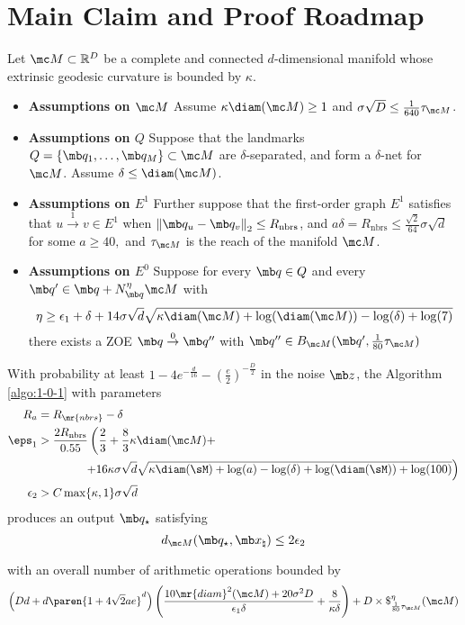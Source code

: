 \section{Main Claim and Proof Roadmap}
\begin{theorem} 
Let $\mc M \subset \mathbb{R}^D$ be a complete and connected $d$-dimensional manifold whose extrinsic geodesic curvature is bounded by $\kappa$. 
\begin{itemize}
    \item {\bf Assumptions on $\mc M$}
    Assume $\kappa \diam(\mc M) \ge 1$ and $\sigma \sqrt{D} \leq \frac{1}{640} \tau_{\mc M}$.
    \item {\bf Assumptions on $Q$} Suppose that the landmarks $Q=\left\{\mb q_1, \dots, \mb q_{ M}\right\} \subset \mc M$ are $\delta$-separated, and form a $\delta$-net for $\mc M$. Assume $\delta \le \diam(\mc M)$.
    \item {\bf Assumptions on $E^1$} Further suppose that the first-order graph $E^1$ satisfies that $u \overset{1}{\rightarrow} v \in E^1$ when $\left\|\mb q_u - \mb q_v\right\|_2 \leq R_{\text{nbrs}}$, and ${a\delta} = R_{\text{nbrs}} \leq \frac{\sqrt{2}}{64}\sigma\sqrt{d}$ for some $a\ge40,$ and $\tau_{\mc M}$ is the reach of the manifold $\mc M$.  
    \item {\bf Assumptions on $E^0$}  Suppose for every $\mb q \in Q$ and every $\mb q' \in \mb q + N^{\eta}_{\mb q}\mc M$ with 
    \begin{equation}  \eta \geq  \epsilon_1 + \delta + 14\sigma\sqrt{d}\sqrt{\kappa\diam(\mc M)+\log(\diam(\mc M))-\log(\delta)+\log(7)}
    \end{equation} there exists a ZOE $\mb q \overset{0}{\rightarrow} \mb q''$ with $\mb q'' \in B_{\mc M}( \mb q', \frac{1}{80}\tau_{\mc M} )$
\end{itemize} 
With probability at least $ 1-4e^{-\frac{d}{16}} - \left(\frac{e}{2}\right)^{-\frac{D}{2}}$ in the noise $\mb z$, the Algorithm \ref{algo:1-0-1} with parameters 
\begin{align} 
R_a &= R_{\mr{nbrs}} - \delta\\
\eps_1 &>  \frac{2R_{\text{nbrs}}}{0.55}\left(\frac{2}{3} + \frac{8}{3}\kappa \diam(\mc M) + \right.\\
&\qquad \qquad \left.+16\kappa\sigma\sqrt{d}\sqrt{\kappa \diam(\sM) + \log(a) - \log(\delta) + \log(\diam(\sM)) + \log(100)}\right) \\ 
\epsilon_2 &> C\max\{\kappa,1\} \sigma \sqrt{d} 
\end{align} 
produces an output $\mb q_\star$ satisfying \begin{equation}
    d_{\mc M}(\mb q_\star, \mb x_\natural) \leq 2\epsilon_2
\end{equation}

with an overall number of arithmetic operations bounded by 
    \begin{equation}
       \left(Dd + d \paren{1 + 4\sqrt{2} a e }^d\right)\left( \frac{10 \mr{diam}^2(\mc M) + 20 \sigma^2 D}{ \epsilon_1 \delta } + \frac{8}{\kappa \delta}\right) + D \times \$^{\eta}_{\frac{1}{80} \tau_{\mc M}} (\mc M)
    \end{equation}
\end{theorem} 


